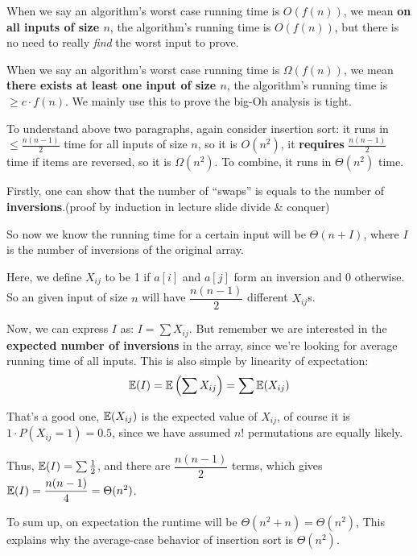 \begin{spacing}{1.3}
    When we say an algorithm’s worst case running time is $O(f(n))$,
    we mean {\bf on all inputs of size $n$}, the algorithm’s 
    running time is $O(f(n))$, but there is no need to really 
    {\it find} the worst input to prove.

    When we say an algorithm’s worst case running time is $\Omega(f(n))$,
    we mean {\bf there exists at least one input of size $n$}, the algorithm’s 
    running time is $\ge c\cdot f(n)$. We mainly use this to prove 
    the big-Oh analysis is tight.

    To understand above two paragraphs, again consider insertion
    sort: it runs in $\le \frac{n(n-1)}{2}$ time for all inputs 
    of size $n$, so it is $O(n^2)$, it {\bf requires} 
    $\frac{n(n-1)}{2}$ time if items are reversed, 
    so it is $\Omega(n^2)$. To combine, it runs in $\Theta(n^2)$ time.



    \newpage

    Firstly, one can show that the number of ``swaps'' 
    is equals to the number of {\bf inversions}.(proof by induction in 
    lecture slide divide \& conquer)

    So now we know the running time for a certain input
    will be $\Theta(n+I)$, 
    where $I$ is the number of inversions of the original array.

    Here, we define $X_{ij}$ to be 1 if $a[i]$ and $a[j]$ form 
    an inversion and 0 otherwise. So an given input of size $n$
    will have $\dfrac{n(n-1)}{2}$ different $X_{ij}$s.

    Now, we can express $I$ as: $I=\sum X_{ij}$. But 
    remember we are interested in the {\bf expected number 
    of inversions} in the array, since we're looking for average 
    running time of all inputs. This is also simple by 
    linearity of expectation: $$\mathbb{E}(I)=\mathbb{E}\left(\sum X_{ij}\right)=\sum \mathbb{E}(X_{ij})$$

    That's a good one, $\mathbb{E}(X_{ij})$ is the expected value
    of $X_{ij}$, of course it is $1\cdot P(X_{ij}=1)=0.5$, 
    since we have assumed $n!$ permutations are equally likely.

    Thus, $\mathbb{E}(I)=\sum \frac{1}{2}$, and there are $\dfrac{n(n-1)}{2}$ terms,
    which gives $\mathbb{E}(I)=\dfrac{n(n-1)}{4}=\Theta(n^2)$.

    To sum up, on expectation the runtime will be
    $\Theta(n^2+n)=\Theta(n^2)$, This explains why the average-case 
    behavior of insertion sort is $\Theta(n^2)$.
\end{spacing}
